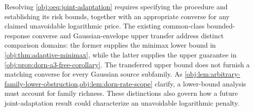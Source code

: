 Resolving \cref{obj:oeq:joint-adaptation} requires specifying the procedure and establishing its risk bounds, together with an appropriate converse for any claimed unavoidable logarithmic price. The existing common-class bounded-response converse and Gaussian-envelope upper transfer address distinct comparison domains: the former supplies the minimax lower bound in \cref{obj:thm:adaptive-minimax}, while the latter supplies the upper guarantee in \cref{obj:prop:dorn-a3-free-corollary}. The transferred upper bound does not furnish a matching converse for every Gaussian source subfamily. As \cref{obj:lem:arbitrary-family-lower-obstruction,obj:lem:dorn-rate-scope} clarify, a lower-bound analysis must account for family richness. These distinctions also govern how a future joint-adaptation result could characterize an unavoidable logarithmic penalty.
